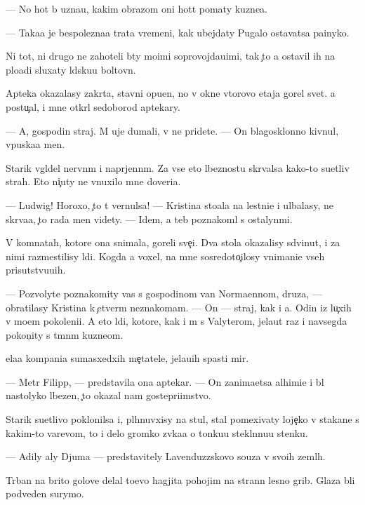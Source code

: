 \documentclass[10pt]{book}
\begin{document}
— No hot{\ia} b{\yi} uzna{\y}u, kakim obrazom oni hot{\ia}t po{\y}maty kuzne{\q}a.

— Taka{\y}a je bespolezna{\y}a trata vremeni, kak ubejdaty Pugalo ostavatsa pa{\y}inyko{\y}.

Ni tot, ni drugo{\y} ne zahoteli b{\yi}ty mo{\y}imi soprovojda{\y}u{\x}imi, tak {\c}to {\y}a ostavil ih na plo{\x}adi sluxaty l{\iu}dsku{\y}u boltovn{\iu}.

Apteka okazalasy zakr{\yi}ta, stavni opu{\x}en{\yi}, no v okne vtorovo etaja gorel svet. {\Y}a postu{\c}al, i mne otkr{\yi}l sedoborod{\yi}{\y} aptekary.

— A, gospodin straj. M{\yi} uje dumali, v{\yi} ne pridete. — On blagosklonno kivnul, vpuska{\y}a men{\ia}.

Starik v{\yi}gl{\ia}del nervn{\yi}m i napr{\ia}jenn{\yi}m. Za vse{\y} eto{\y} l{\iu}beznost{\y}u skr{\yi}valsa kako{\y}-to su{\y}etliv{\yi}{\y} strah. Eto ni{\c}uty ne vnuxilo mne doveri{\y}a.

— Ludwig! Horoxo, {\c}to t{\yi} vernulsa! — Kristina sto{\y}ala na lestni{\q}e i ul{\yi}balasy, ne skr{\yi}va{\y}a, {\c}to rada men{\ia} videty. — Idem, {\y}a teb{\ia} poznakoml{\iu} s ostalyn{\yi}mi.

V komnatah, kotor{\yi}{\y}e ona snimala, goreli sve{\c}i. Dva stola okazalisy sdvinut{\yi}, i za nimi razmestilisy l{\iu}di. Kogda {\y}a voxel, na mne sosredoto{\c}ilosy vnimani{\y}e vseh prisutstvu{\y}u{\x}ih.

— Pozvolyte poznakomity vas s gospodinom van Norma{\y}ennom, druz{\y}a, — obratilasy Kristina k {\c}etver{\yi}m neznakom{\q}am. — On — straj, kak i {\y}a. Odin iz lu{\c}xih v mo{\y}em pokoleni{\y}i. A eto l{\iu}di, kotor{\yi}{\y}e, kak i m{\yi} s Valyterom, jela{\y}ut raz i navsegda pokon{\c}ity s t{\e}mn{\yi}m kuzne{\q}om.

{\Q}ela{\y}a kompani{\y}a sumasxedxih me{\c}tatele{\y}, jela{\y}u{\x}ih spasti mir.

— Metr Filipp, — predstavila ona aptekar{\ia}. — On zanima{\y}etsa alhimi{\y}e{\y} i b{\yi}l nastolyko l{\iu}bezen, {\c}to okazal nam gostepri{\y}imstvo.

Starik su{\y}etlivo poklonilsa i, pl{\iu}hnuvxisy na stul, stal pomexivaty loje{\c}ko{\y} v stakane s kakim-to varevom, to i delo gromko zv{\ia}ka{\y}a o tonku{\y}u stekl{\ia}nnu{\y}u stenku.

— Adily aly Djuma — predstavitely Lavenduzzskovo so{\y}uza v svo{\y}ih zeml{\ia}h.

T{\iu}rban na brito{\y} golove delal to{\x}evo hagjita pohojim na strann{\yi}{\y} lesno{\y} grib. Glaza b{\yi}li podveden{\yi} surymo{\y}.
\end{document}
